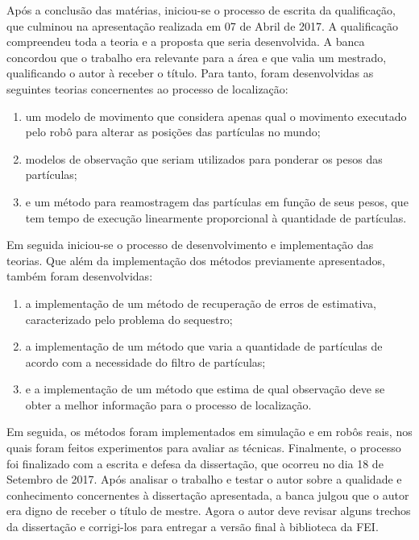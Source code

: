 \documentclass[
  12pt,       %
  oneside,
  a4paper,      %
  english,      %
  french,       %
  spanish,      %
  brazil,       %
  ]{abntex2}
\begin{document}
Após a conclusão das matérias, iniciou-se o processo de escrita da qualificação, que culminou na apresentação realizada em 07 de Abril de 2017.
A qualificação compreendeu toda a teoria e a proposta que seria desenvolvida.
A banca concordou que o trabalho era relevante para a área e que valia um mestrado, qualificando o autor à receber o título.
Para tanto, foram desenvolvidas as seguintes teorias concernentes ao processo de localização:
%
\begin{enumerate}
  \item um modelo de movimento que considera apenas qual o movimento executado pelo robô para alterar as posições das partículas no mundo;

  \item modelos de observação que seriam utilizados para ponderar os pesos das partículas;

  \item e um método para reamostragem das partículas em função de seus pesos, que tem tempo de execução linearmente proporcional à quantidade de partículas.
\end{enumerate}

Em seguida iniciou-se o processo de desenvolvimento e implementação das teorias.
Que além da implementação dos métodos previamente apresentados, também foram desenvolvidas:
%
\begin{enumerate}
  \item a implementação de um método de recuperação de erros de estimativa, caracterizado pelo problema do sequestro;

  \item a implementação de um método que varia a quantidade de partículas de acordo com a necessidade do filtro de partículas;

  \item e a implementação de um método que estima de qual observação deve se obter a melhor informação para o processo de localização.
\end{enumerate}
%
Em seguida, os métodos foram implementados em simulação e em robôs reais, nos quais foram feitos experimentos para avaliar as técnicas.
Finalmente, o processo foi finalizado com a escrita e defesa da dissertação, que ocorreu no dia 18 de Setembro de 2017.
Após analisar o trabalho e testar o autor sobre a qualidade e conhecimento concernentes à dissertação apresentada, a banca julgou que o autor era digno de receber o título de mestre.
Agora o autor deve revisar alguns trechos da dissertação e corrigi-los para entregar a versão final à biblioteca da FEI.
\end{document}
